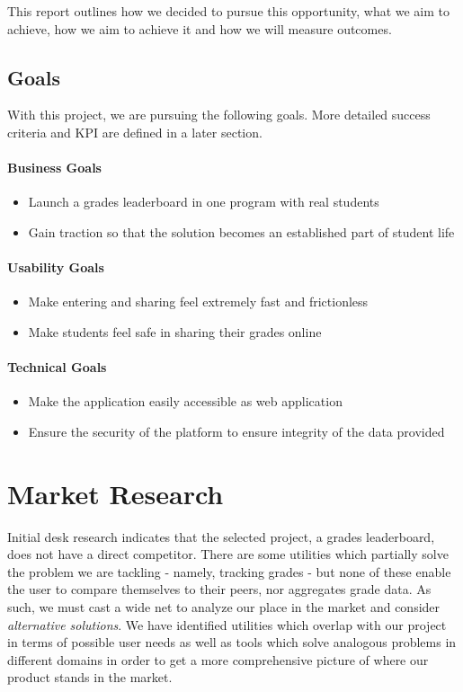 This report outlines how we decided to pursue this opportunity, what we aim to achieve, how we aim to achieve it and how we will measure outcomes.

\subsection{Goals}
With this project, we are pursuing the following goals. More detailed success criteria and KPI are defined in a later section.

\paragraph{Business Goals}
\begin{itemize}
    \item Launch a grades leaderboard in one program with real students
    \item Gain traction so that the solution becomes an established part of student life
\end{itemize}

\paragraph{Usability Goals}
\begin{itemize}
    \item Make entering and sharing feel extremely fast and frictionless
    \item Make students feel safe in sharing their grades online
\end{itemize}

\paragraph{Technical Goals}
\begin{itemize}
    \item Make the application easily accessible as web application
    \item Ensure the security of the platform to ensure integrity of the data provided
\end{itemize}


\section{Market Research}
Initial desk research indicates that the selected project, a grades leaderboard, does not have a direct competitor. There are some utilities which partially solve the problem we are tackling - namely, tracking grades - but none of these enable the user to compare themselves to their peers, nor aggregates grade data. As such, we must cast a wide net to analyze our place in the market and consider \emph{alternative solutions}. We have identified utilities which overlap with our project in terms of possible user needs as well as tools which solve analogous problems in different domains in order to get a more comprehensive picture of where our product stands in the market.
